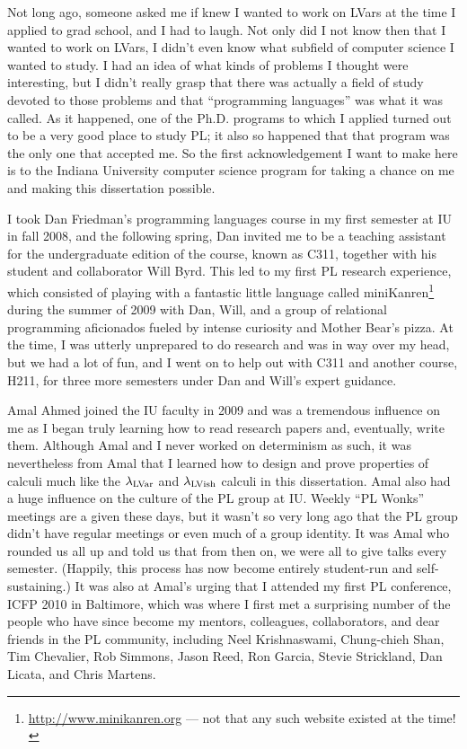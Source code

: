 Not long ago, someone asked me if knew I wanted to work on LVars at the time I applied to grad school, and I had to laugh.  Not only did I not know then that I wanted to work on LVars, I didn't even know what subfield of computer science I wanted to study.  I had an idea of what kinds of problems I thought were interesting, but I didn't really grasp that there was actually a field of study devoted to those problems and that ``programming languages'' was what it was called.  As it happened, one of the Ph.D. programs to which I applied turned out to be a very good place to study PL; it also so happened that that program was the only one that accepted me.  So the first acknowledgement I want to make here is to the Indiana University computer science program for taking a chance on me and making this dissertation possible.

I took Dan Friedman's programming languages course in my first semester at IU in fall 2008, and the following spring, Dan invited me to be a teaching assistant for the undergraduate edition of the course, known as C311, together with his student and collaborator Will Byrd.  This led to my first PL research experience, which consisted of playing with a fantastic little language called miniKanren\footnote{\url{http://www.minikanren.org} --- not that any such website existed at the time!} during the summer of 2009 with Dan, Will, and a group of relational programming aficionados fueled by intense curiosity and Mother Bear's pizza.  At the time, I was utterly unprepared to do research and was in way over my head, but we had a lot of fun, and I went on to help out with C311 and another course, H211, for three more semesters under Dan and Will's expert guidance.

Amal Ahmed joined the IU faculty in 2009 and was a tremendous influence on me as I began truly learning how to read research papers and, eventually, write them.  Although Amal and I never worked on determinism as such, it was nevertheless from Amal that I learned how to design and prove properties of calculi much like the $\lambda_{\textrm{LVar}}$ and $\lambda_{\textrm{LVish}}$ calculi in this dissertation.  Amal also had a huge influence on the culture of the PL group at IU.  Weekly ``PL Wonks'' meetings are a given these days, but it wasn't so very long ago that the PL group didn't have regular meetings or even much of a group identity.  It was Amal who rounded us all up and told us that from then on, we were all to give talks every semester.  (Happily, this process has now become entirely student-run and self-sustaining.)  It was also at Amal's urging that I attended my first PL conference, ICFP 2010 in Baltimore, which was where I first met a surprising number of the people who have since become my mentors, colleagues, collaborators, and dear friends in the PL community, including Neel Krishnaswami, Chung-chieh Shan, Tim Chevalier, Rob Simmons, Jason Reed, Ron Garcia, Stevie Strickland, Dan Licata, and Chris Martens.

